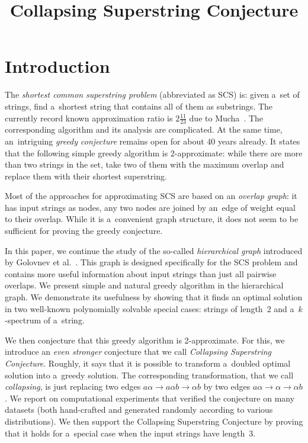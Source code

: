 \documentclass[11pt,letterpaper]{article}
\begin{document}
\sloppy
\author{}
\date{}
\title{Collapsing Superstring Conjecture}
\maketitle
\tableofcontents

\section{Introduction}
The {\em shortest common superstring problem} (abbreviated as SCS) is:
given a~set of strings, find a~shortest string that contains all of them as
substrings. The currently record known approximation ratio is 
$2\frac{11}{23}$ due to Mucha~\cite{}.
The corresponding algorithm and its analysis are complicated.
At the same time, an~intriguing {\em greedy conjecture} remains open
for about 40 years already. It states that the following simple 
greedy algorithm is 2-approximate: while there are more than two strings 
in the set, take two of them with the maximum overlap and replace them
with their shortest superstring.

Most of the approaches for approximating SCS are based on an
{\em overlap graph}: it has input strings as nodes, any two nodes 
are joined by an~edge of weight equal to their overlap.  
While it is a~convenient graph structure, it does not seem to be sufficient
for proving the greedy conjecture.

In this paper, we continue the study of the so-called {\em hierarchical graph}
introduced by Golovnev et al.~\cite{}. This graph is designed specifically 
for the SCS problem and contains more useful information about input strings
than just all pairwise overlaps. We present simple and natural greedy algorithm
in the hierarchical graph. 
We demonstrate its usefulness by showing that it finds an optimal solution 
in two well-known polynomially solvable special cases: strings of length~2 and
a~$k$-spectrum of a~string.

We then conjecture that this greedy algorithm is 2-approximate. For this, we introduce an {\em even stronger} conjecture that we call 
{\em Collapsing Superstring Conjecture}. 
Roughly, it says that it is possible to transform a~doubled optimal 
solution into a~greedy solution. 
The corresponding transformation, that we call {\em collapsing}, 
is just replacing two edges $a\alpha \to a\alpha b \to \alpha b$ 
by two edges $a\alpha \to \alpha \to \alpha b$. 
We report on computational experiments that verified the 
conjecture on many datasets (both hand-crafted and generated randomly
according to various distributions). 
We then support the Collapsing Superstring Conjecture by 
proving that it holds for a~special case when the input strings have length~3.
\end{document}
